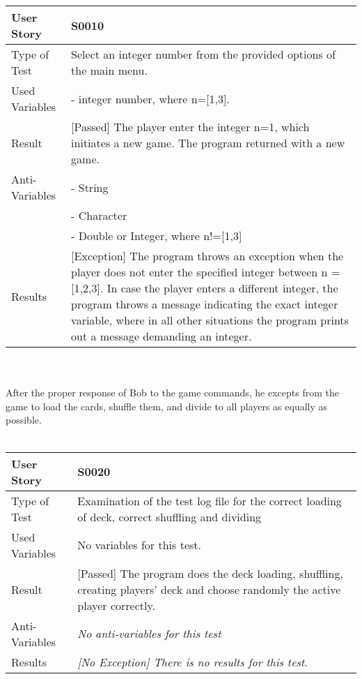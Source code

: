 \begin{tabular}{l | p{10cm}}
User Story & \textbf{S0010}\\ \hline
Type of Test & Select an integer number from the provided options of the main menu.\\ \hline
Used Variables & - integer number, where n=[1,3].\\ \hline
Result & [Passed] The player enter the integer n=1, which initiates a new game. The program returned with a new game.\\ \hline
Anti-Variables & - String\\
& - Character\\
& - Double or Integer, where n!=[1,3]\\
\hline
Results & [Exception] The program throws an exception when the player does not enter the specified integer between n = [1,2,3]. In case the player enters a different integer, the program throws a message indicating the exact integer variable, where in all other situations the program prints out a message demanding an integer.\\ \hline 
\end{tabular}\\
\vspace{0.8cm}\\
After the proper response of Bob to the game commands, he excepts from the game to load the cards, shuffle them, and divide to all players as equally as possible.\\
\vspace{0.2cm}\\
\begin{tabular}{l | p{10cm}}
User Story & \textbf{S0020}\\ \hline
Type of Test & Examination of the test log file for the correct loading of deck, correct shuffling and dividing\\ \hline
Used Variables & No variables for this test.\\ \hline
Result & [Passed] The program does the deck loading, shuffling, creating players' deck and choose randomly the active player correctly. \\ \hline
Anti-Variables & \textit{No anti-variables for this test} \\ \hline
Results & \textit{[No Exception] There is no results for this test.} \\ \hline
\end{tabular}\\
\vspace{0.8cm}\\
